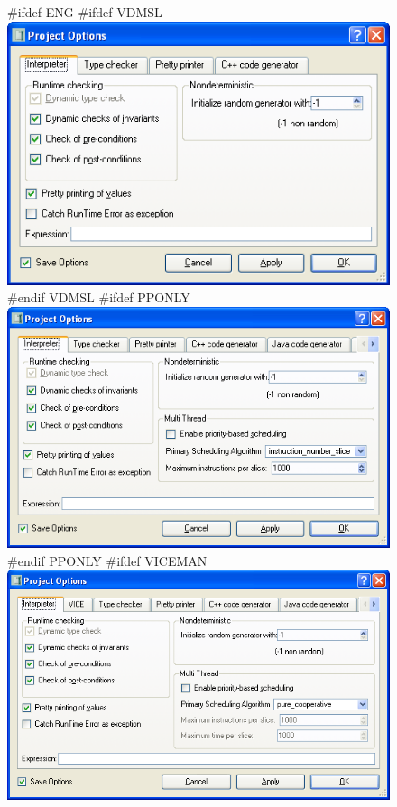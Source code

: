 \documentclass[\pformat,12pt]{article}
\begin{document}
\begin{figure}[tbh]
\begin{center}
#ifdef ENG
#ifdef VDMSL
\includegraphics[width=12.5cm]{interpreterOptions-slENG.png}
#endif VDMSL
#ifdef PPONLY
\includegraphics[width=12.5cm]{interpreterOptions-ppENG.png}
#endif PPONLY
#ifdef VICEMAN
\includegraphics[width=12.5cm]{interpreterOptions-viceENG.png}

\end{center}
\end{figure}
\end{document}
